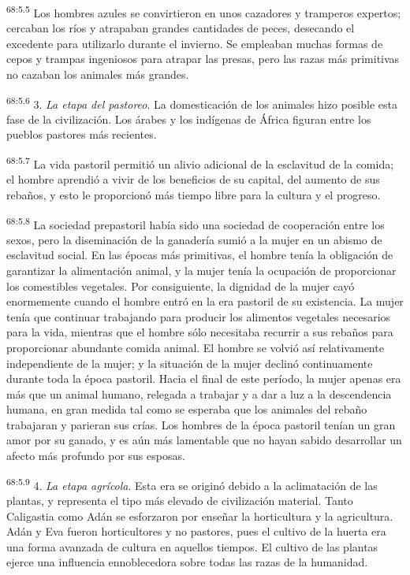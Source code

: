 \par
\textsuperscript{68:5.5} Los hombres azules se convirtieron en unos cazadores y tramperos expertos; cercaban los ríos y atrapaban grandes cantidades de peces, desecando el excedente para utilizarlo durante el invierno. Se empleaban muchas formas de cepos y trampas ingeniosos para atrapar las presas, pero las razas más primitivas no cazaban los animales más grandes.

\par
\textsuperscript{68:5.6} 3. \textit{La etapa del pastoreo}. La domesticación de los animales hizo posible esta fase de la civilización. Los árabes y los indígenas de África figuran entre los pueblos pastores más recientes.

\par
\textsuperscript{68:5.7} La vida pastoril permitió un alivio adicional de la esclavitud de la comida; el hombre aprendió a vivir de los beneficios de su capital, del aumento de sus rebaños, y esto le proporcionó más tiempo libre para la cultura y el progreso.

\par
\textsuperscript{68:5.8} La sociedad prepastoril había sido una sociedad de cooperación entre los sexos, pero la diseminación de la ganadería sumió a la mujer en un abismo de esclavitud social. En las épocas más primitivas, el hombre tenía la obligación de garantizar la alimentación animal, y la mujer tenía la ocupación de proporcionar los comestibles vegetales. Por consiguiente, la dignidad de la mujer cayó enormemente cuando el hombre entró en la era pastoril de su existencia. La mujer tenía que continuar trabajando para producir los alimentos vegetales necesarios para la vida, mientras que el hombre sólo necesitaba recurrir a sus rebaños para proporcionar abundante comida animal. El hombre se volvió así relativamente independiente de la mujer; y la situación de la mujer declinó continuamente durante toda la época pastoril. Hacia el final de este período, la mujer apenas era más que un animal humano, relegada a trabajar y a dar a luz a la descendencia humana, en gran medida tal como se esperaba que los animales del rebaño trabajaran y parieran sus crías. Los hombres de la época pastoril tenían un gran amor por su ganado, y es aún más lamentable que no hayan sabido desarrollar un afecto más profundo por sus esposas.

\par
\textsuperscript{68:5.9} 4. \textit{La etapa agrícola}. Esta era se originó debido a la aclimatación de las plantas, y representa el tipo más elevado de civilización material. Tanto Caligastia como Adán se esforzaron por enseñar la horticultura y la agricultura. Adán y Eva fueron horticultores y no pastores, pues el cultivo de la huerta era una forma avanzada de cultura en aquellos tiempos. El cultivo de las plantas ejerce una influencia ennoblecedora sobre todas las razas de la humanidad.

